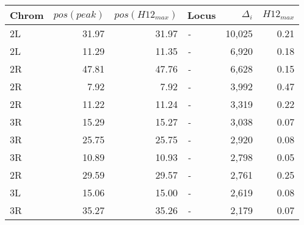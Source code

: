 \begin{tabular}{lrrlrr}
\toprule
Chrom & $pos(peak)$ & $pos(H12_{max})$ &       Locus & $\Delta_{i}$ & $H12_{max}$ \\
\midrule
   2L &       31.97 &            31.97 &  \textit{-} &       10,025 &        0.21 \\
   2L &       11.29 &            11.35 &  \textit{-} &        6,920 &        0.18 \\
   2R &       47.81 &            47.76 &  \textit{-} &        6,628 &        0.15 \\
   2R &        7.92 &             7.92 &  \textit{-} &        3,992 &        0.47 \\
   2R &       11.22 &            11.24 &  \textit{-} &        3,319 &        0.22 \\
   3R &       15.29 &            15.27 &  \textit{-} &        3,038 &        0.07 \\
   3R &       25.75 &            25.75 &  \textit{-} &        2,920 &        0.08 \\
   3R &       10.89 &            10.93 &  \textit{-} &        2,798 &        0.05 \\
   2R &       29.59 &            29.57 &  \textit{-} &        2,761 &        0.25 \\
   3L &       15.06 &            15.00 &  \textit{-} &        2,619 &        0.08 \\
   3R &       35.27 &            35.26 &  \textit{-} &        2,179 &        0.07 \\
\bottomrule
\end{tabular}
